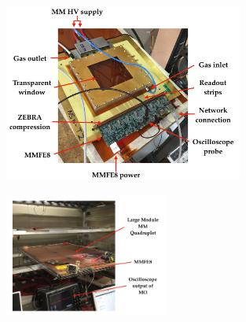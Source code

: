 \begin{figure}[!htb]
    \begin{center}
        \includegraphics[width=0.7\textwidth]{figures/nsw/frontend/mmfe8_t2_labelledPDF}
        \caption{
        }
        \label{fig:mmfe8_t2}
    \end{center}
\end{figure}

\begin{figure}[!htb]
    \begin{center}
        \includegraphics[width=0.48\textwidth]{figures/nsw/frontend/mmfe8_lm2_labelledPDF}
        \caption{
            {\color{red}{Explain how the frontend boards are situated on the NSW chambers}}
        }
        \label{fig:mm_quad_elx}
    \end{center}
\end{figure}
